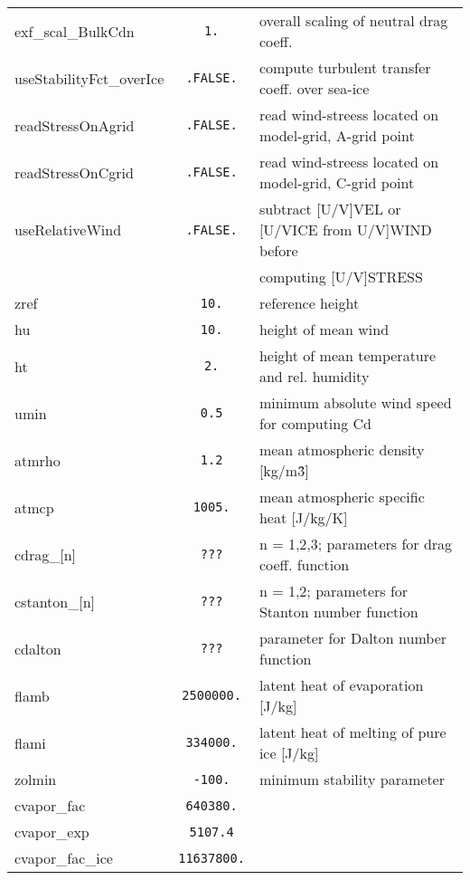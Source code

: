 \begin{table}[h!]
{\begin{tabular}{|l|c|l|}
        exf\_scal\_BulkCdn & \texttt{1.} & 
          overall scaling of neutral drag coeff. \\
        useStabilityFct\_overIce  & \texttt{.FALSE.} & 
          compute turbulent transfer coeff. over sea-ice \\
        readStressOnAgrid & \texttt{.FALSE.} & 
          read wind-streess located on model-grid, A-grid point \\
        readStressOnCgrid & \texttt{.FALSE.} & 
          read wind-streess located on model-grid, C-grid point \\
        useRelativeWind & \texttt{.FALSE.} & 
          subtract [U/V]VEL or [U/VICE from U/V]WIND before \\
        ~ & ~ &  computing [U/V]STRESS \\
        zref & \texttt{10.} & 
          reference height \\
        hu & \texttt{10.} & 
          height of mean wind \\
        ht & \texttt{2.} & 
          height of mean temperature and rel. humidity \\
        umin & \texttt{0.5} & 
          minimum absolute wind speed for computing Cd \\
        atmrho & \texttt{1.2} & 
          mean atmospheric density [kg/m\^3] \\
        atmcp & \texttt{1005.} & 
          mean atmospheric specific heat [J/kg/K] \\
        cdrag\_[n] & \texttt{???} & 
          n = 1,2,3; parameters for drag coeff. function \\
        cstanton\_[n] & \texttt{???} & 
          n = 1,2; parameters for Stanton number function \\
        cdalton & \texttt{???} & 
          parameter for Dalton number function \\
        flamb & \texttt{2500000.} & 
          latent heat of evaporation [J/kg] \\
        flami & \texttt{334000.} & 
          latent heat of melting of pure ice [J/kg] \\
        zolmin & \texttt{-100.} & 
          minimum stability parameter \\
        cvapor\_fac & \texttt{640380.} & 
          ~ \\
        cvapor\_exp & \texttt{5107.4} & 
          ~ \\
        cvapor\_fac\_ice & \texttt{11637800.} & 
          ~ \\

\end{tabular}}
\end{table}
